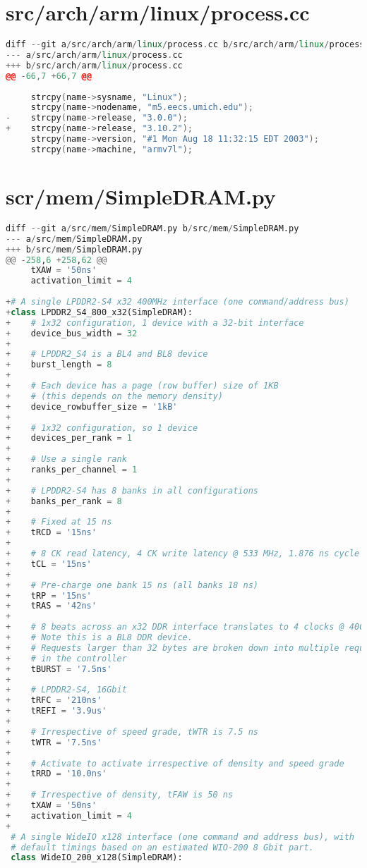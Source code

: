 \section{src/arch/arm/linux/process.cc}
\begin{lstlisting}[language=C++]
diff --git a/src/arch/arm/linux/process.cc b/src/arch/arm/linux/process.cc
--- a/src/arch/arm/linux/process.cc
+++ b/src/arch/arm/linux/process.cc
@@ -66,7 +66,7 @@
 
     strcpy(name->sysname, "Linux");
     strcpy(name->nodename, "m5.eecs.umich.edu");
-    strcpy(name->release, "3.0.0");
+    strcpy(name->release, "3.10.2");
     strcpy(name->version, "#1 Mon Aug 18 11:32:15 EDT 2003");
     strcpy(name->machine, "armv7l");
\end{lstlisting}
\vfill

\section{scr/mem/SimpleDRAM.py}
\label{gem5simpledram}
\begin{lstlisting}[language=python,basicstyle=\tiny,numberstyle=\tiny]
diff --git a/src/mem/SimpleDRAM.py b/src/mem/SimpleDRAM.py
--- a/src/mem/SimpleDRAM.py
+++ b/src/mem/SimpleDRAM.py
@@ -258,6 +258,62 @@
     tXAW = '50ns'
     activation_limit = 4
 
+# A single LPDDR2-S4 x32 400MHz interface (one command/address bus)
+class LPDDR2_S4_800_x32(SimpleDRAM):
+    # 1x32 configuration, 1 device with a 32-bit interface
+    device_bus_width = 32
+
+    # LPDDR2_S4 is a BL4 and BL8 device
+    burst_length = 8
+
+    # Each device has a page (row buffer) size of 1KB
+    # (this depends on the memory density)
+    device_rowbuffer_size = '1kB'
+
+    # 1x32 configuration, so 1 device
+    devices_per_rank = 1
+
+    # Use a single rank
+    ranks_per_channel = 1
+
+    # LPDDR2-S4 has 8 banks in all configurations
+    banks_per_rank = 8
+
+    # Fixed at 15 ns
+    tRCD = '15ns'
+
+    # 8 CK read latency, 4 CK write latency @ 533 MHz, 1.876 ns cycle time
+    tCL = '15ns'
+
+    # Pre-charge one bank 15 ns (all banks 18 ns)
+    tRP = '15ns'
+    tRAS = '42ns'
+
+    # 8 beats across an x32 DDR interface translates to 4 clocks @ 400 MHz.
+    # Note this is a BL8 DDR device.
+    # Requests larger than 32 bytes are broken down into multiple requests
+    # in the controller
+    tBURST = '7.5ns'
+
+    # LPDDR2-S4, 16Gbit
+    tRFC = '210ns'
+    tREFI = '3.9us'
+
+    # Irrespective of speed grade, tWTR is 7.5 ns
+    tWTR = '7.5ns'
+
+    # Activate to activate irrespective of density and speed grade
+    tRRD = '10.0ns'
+
+    # Irrespective of density, tFAW is 50 ns
+    tXAW = '50ns'
+    activation_limit = 4
+
 # A single WideIO x128 interface (one command and address bus), with
 # default timings based on an estimated WIO-200 8 Gbit part.
 class WideIO_200_x128(SimpleDRAM):
\end{lstlisting}
\vfill

